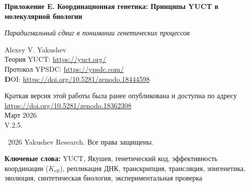 \documentclass[12pt]{article}
\begin{document}
	
	\begin{titlepage}
		\begin{center}
			\vspace*{0cm}
			
			\Huge\textbf{Приложение E. Координационная генетика: Принципы YUCT в молекулярной биологии}
			
			\vspace{1cm}
			
			\small\textit{Парадигмальный сдвиг в понимании генетических процессов}
			
			\vspace{1cm}
			\Large
			Alexey V. Yakushev\\
			
			Теория YUCT: \url{https://yuct.org/}\\
			Протокол YPSDC: \url{https://ypsdc.com/}\\
			
			\vspace{2cm}
			\textbf DOI: \url{https://doi.org/10.5281/zenodo.18444598}\\
			
			\vspace{1cm}
			
			\vspace{0cm}
			\large 
			Краткая версия этой работы была ранее опубликована и доступна по адресу\\ \url{https://doi.org/10.5281/zenodo.18362308}\\
			\vspace{1cm}
			Март 2026 \\ \large V.2.5.
			
			\vspace{4cm}
			\textcopyright~2026 Yakushev Research. Все права защищены.
			
			\newpage	
			\begin{abstract}
				\noindent
				Эта работа представляет фундаментальное переосмысление генетических процессов через призму координационных принципов Якушева. Мы демонстрируем, что генетический код, репликация ДНК, экспрессия генов и эволюция представляют собой координационные процессы с измеримой эффективностью $K_{\text{eff}}$. Представлены новые математические модели, предсказывающие ранее необъяснимые явления и открывающие пути к программируемой эволюции. Теория даёт проверяемые предсказания в нескольких экспериментальных областях — от простых лабораторных тестов до сложных проектов генной инженерии.
			\end{abstract}
			
			\vspace{0cm}
			
			\noindent
			\textbf{Ключевые слова:} YUCT, Якушев, генетический код, эффективность координации ($K_{\text{eff}}$), репликация ДНК, транскрипция, трансляция, эпигенетика, эволюция, синтетическая биология, экспериментальная проверка
			
			\vspace{0.5cm}
			
		\end{center}
	\end{titlepage}
	
\end{document}
